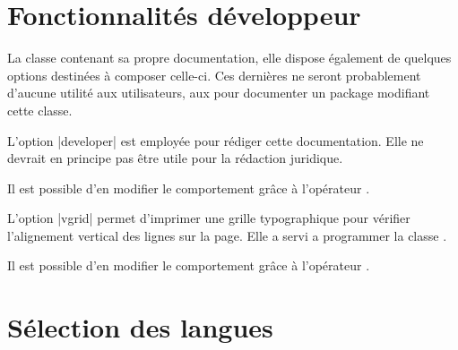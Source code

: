 
\section{Fonctionnalités développeur}

La classe \frenchlaw contenant sa propre documentation, elle dispose également de quelques options destinées à composer celle-ci. Ces dernières ne seront probablement d'aucune utilité aux utilisateurs, aux pour documenter un package modifiant cette classe.

L'option |developer| est employée pour rédiger cette documentation. Elle ne devrait en principe pas être utile pour la rédaction juridique.

\begin{developer}
Il est possible d'en modifier le comportement grâce à l'opérateur .
\end{developer}

\begin{noprint}
\end{noprint}

L'option |vgrid| permet d'imprimer une grille typographique pour vérifier l'alignement vertical des lignes sur la page. Elle a servi a programmer la classe \frenchlaw.

\begin{developer}
Il est possible d'en modifier le comportement grâce à l'opérateur .
\end{developer}

\begin{noprint}
\end{noprint}



\section{Sélection des langues}

